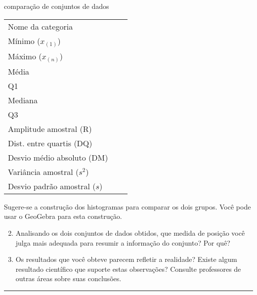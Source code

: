 \begin{task}{ comparação de conjuntos de dados}
\begin{savenotes}\sphinxattablestart
\centering
{}
\label{\detokenize{PE104-5:id1}}
\sphinxaftercaption
\begin{tabulary}{\linewidth}[t]{|T|T|T|}
\hline
\sphinxstylethead{\sphinxstyletheadfamily \unskip}\relax &\relax &\relax \\
\hline
Nome da categoria
&&\\
\hline
Mínimo (\(x_{(1)}\))
&&\\
\hline
Máximo  (\(x_{(n)}\))
&&\\
\hline
Média
&&\\
\hline
Q1
&&\\
\hline
Mediana
&&\\
\hline
Q3
&&\\
\hline
Amplitude amostral (R)
&&\\
\hline
Dist. entre quartis (DQ)
&&\\
\hline
Desvio médio absoluto (DM)
&&\\
\hline
Variância amostral (\(s^2\))
&&\\
\hline
Desvio padrão amostral (\(s\))
&&\\
\hline
\end{tabulary}
\par
\sphinxattableend\end{savenotes}

Sugere-se a construção dos histogramas para comparar os dois grupos. Você pode usar o GeoGebra para esta construção.
\end{task}
\begin{enumerate}
\setcounter{enumi}{1}
\item {} 
Analisando os dois conjuntos de dados obtidos, que medida de posição você julga mais adequada para resumir a informação do conjunto? Por quê?

\item {} 
Os resultados que você obteve parecem refletir a realidade? Existe algum resultado científico que suporte estas observações? Consulte  professores de outras áreas sobre suas conclusões.

\end{enumerate}
\label{\detokenize{PE104-5:ativ-aproxima-dpa-usando-r}}

\bigskip\hrule\bigskip

